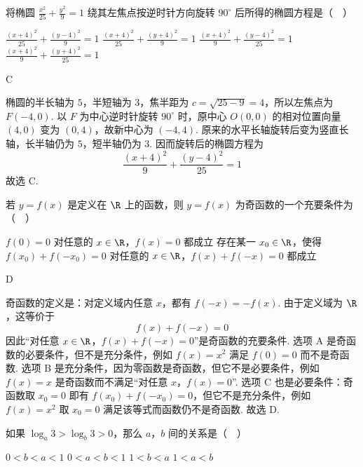 \begin{problem}
将椭圆 \(\frac{x^2}{25}+\frac{y^2}{9}=1\) 绕其左焦点按逆时针方向旋转 \(90^\circ\) 后所得的椭圆方程是（\(\quad\)）

\choices
    {\(\frac{(x+4)^2}{25}+\frac{(y-4)^2}{9}=1\)}
    {\(\frac{(x+4)^2}{25}+\frac{(y+4)^2}{9}=1\)}
    {\(\frac{(x+4)^2}{9}+\frac{(y-4)^2}{25}=1\)}
    {\(\frac{(x+4)^2}{9}+\frac{(y+4)^2}{25}=1\)}
\end{problem}

\begin{answer}
C
\end{answer}

\begin{solution}
椭圆的半长轴为 \(5\)，半短轴为 \(3\)，焦半距为 \(c=\sqrt{25-9}=4\)，所以左焦点为 \(F(-4,0)\). 以 \(F\) 为中心逆时针旋转 \(90^\circ\) 时，原中心 \(O(0,0)\) 的相对位置向量 \((4,0)\) 变为 \((0,4)\)，故新中心为 \((-4,4)\). 原来的水平长轴旋转后变为竖直长轴，长半轴仍为 \(5\)，短半轴仍为 \(3\). 因而旋转后的椭圆方程为
\[
\frac{(x+4)^2}{9}+\frac{(y-4)^2}{25}=1
\]
故选 C.
\end{solution}

\begin{problem}
若 \(y=f(x)\) 是定义在 \(\R\) 上的函数，则 \(y=f(x)\) 为奇函数的一个充要条件为（\(\quad\)）

\choices
    {\(f(0)=0\)}
    {对任意的 \(x\in\R\)，\(f(x)=0\) 都成立}
    {存在某一 \(x_0\in\R\)，使得 \(f(x_0)+f(-x_0)=0\)}
    {对任意的 \(x\in\R\)，\(f(x)+f(-x)=0\) 都成立}
\end{problem}

\begin{answer}
D
\end{answer}

\begin{solution}
奇函数的定义是：对定义域内任意 \(x\)，都有 \(f(-x)=-f(x)\). 由于定义域为 \(\R\)，这等价于
\[
f(x)+f(-x)=0
\]
因此“对任意 \(x\in\R\)，\(f(x)+f(-x)=0\)”是奇函数的充要条件. 选项 A 是奇函数的必要条件，但不是充分条件，例如 \(f(x)=x^2\) 满足 \(f(0)=0\) 而不是奇函数. 选项 B 是充分条件，因为零函数是奇函数，但它不是必要条件，例如 \(f(x)=x\) 是奇函数而不满足“对任意 \(x\)，\(f(x)=0\)”. 选项 C 也是必要条件：奇函数取 \(x_0=0\) 即有 \(f(x_0)+f(-x_0)=0\)，但它不是充分条件，例如 \(f(x)=x^2\) 取 \(x_0=0\) 满足该等式而函数仍不是奇函数. 故选 D.
\end{solution}

\begin{problem}
如果 \(\log_a 3>\log_b 3>0\)，那么 \(a\)，\(b\) 间的关系是（\(\quad\)）

\choices
    {\(0<b<a<1\)}
    {\(0<a<b<1\)}
    {\(1<b<a\)}
    {\(1<a<b\)}
\end{problem}

